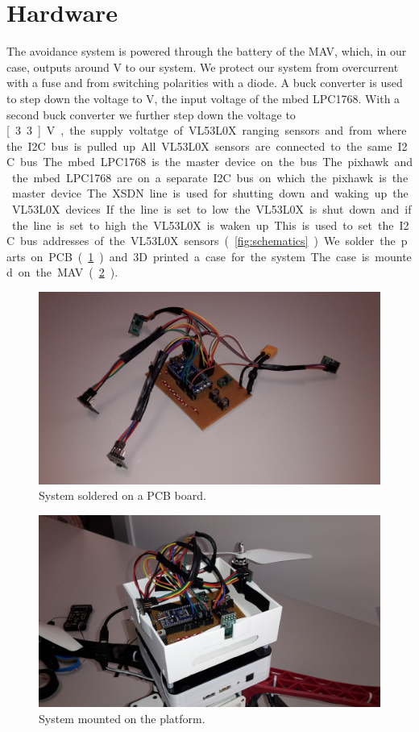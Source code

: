 \section{Hardware}
The avoidance system is powered through the battery of the MAV, which, in our case, outputs around \unit[12]{V} to our system. We protect our system from overcurrent with a fuse and from switching polarities with a diode. A buck converter is used to step down the voltage to \unit[5]{V}, the input voltage of the mbed LPC1768. With a second buck converter we further step down the voltage to \unit[3.3]{V}, the supply voltatge of VL53L0X ranging sensors and from where the I2C bus is pulled up. All VL53L0X sensors are connected to the same I2C bus. The mbed LPC1768 is the master device on the bus. The pixhawk and the mbed LPC1768 are on a separate I2C bus on which the pixhawk is the master device. The XSDN line is used for shutting down and waking up the VL53L0X devices. If the line is set to low the VL53L0X is shut down and if the line is set to high the VL53L0X is waken up. This is used to set the I2C bus addresses of the VL53L0X sensors (\cref{fig:schematics}). We solder the parts on PCB (\cref{fig:pcb}) and 3D printed a case for the system. The case is mounted on the MAV (\cref{fig:system}). 
\begin{figure}
	\centering
	\includegraphics[width=\linewidth]{pictures/pcb.jpg}
	\caption{System soldered on a PCB board.}
	\label{fig:pcb}
\end{figure} 
\begin{figure}
	\centering
	\includegraphics[width=\linewidth]{pictures/system.jpg}
	\caption{System mounted on the platform.}
	\label{fig:system}
\end{figure}
